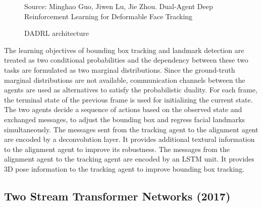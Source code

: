 \documentclass{llncs}
\begin{document}
\begin{figure}
%
{Source: Minghao Guo, Jiwen Lu, Jie Zhou. Dual-Agent Deep Reinforcement Learning for Deformable Face Tracking}
\caption{DADRL architecture}
\label{dadrl_architecture}
\end{figure}

The learning objectives of bounding box tracking and landmark detection are treated as two conditional probabilities and the dependency between these two tasks are formulated as two marginal distributions. Since the ground-truth marginal distributions are not available, communication channels between the agents are used as alternatives to satisfy the probabilistic duality. For each frame, the terminal state of the previous frame is used for initializing the current state. The two agents decide a sequence of actions based on the observed state and exchanged messages, to adjust the bounding box and regress facial landmarks simultaneously. The messages sent from the tracking agent to the alignment agent are encoded by a deconvolution layer. It provides additional textural information to the alignment agent to improve its robustness. The messages from the alignment agent to the tracking agent are encoded by an LSTM unit. It provides 3D pose information to the tracking agent to improve bounding box tracking.\\


\subsection{Two Stream Transformer Networks (2017) \cite{tstn}}
\end{document}
